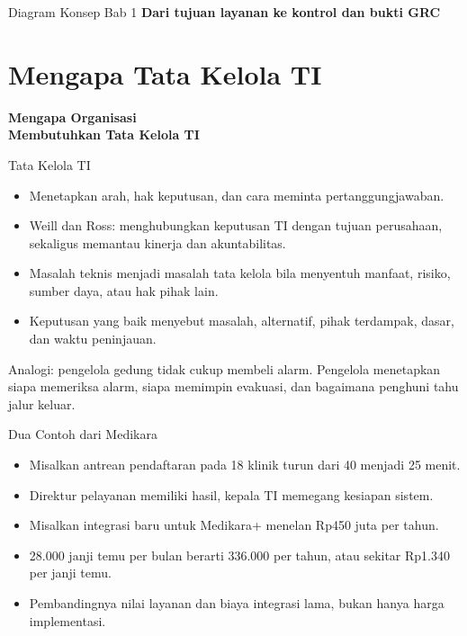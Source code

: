 \documentclass[aspectratio=169, table, 12pt]{beamer}
\begin{document}
\begin{frame}{{\Large Diagram Konsep Bab 1}}
  \centering
  {\small\bfseries Dari tujuan layanan ke kontrol dan bukti GRC}\par\medskip
  \label{fig:session01-ilustrasi-bab}
\end{frame}

\section{Mengapa Tata Kelola TI}

\begin{frame}{\hfill}
  \centering
  \Huge{\textbf{Mengapa Organisasi\\Membutuhkan Tata Kelola TI}}
\end{frame}

\begin{frame}{{\Large Tata Kelola TI}}
  \vspace{4pt}
  \small
  \begin{itemize}
    \item Menetapkan arah, hak keputusan, dan cara meminta pertanggungjawaban.
    \item Weill dan Ross: menghubungkan keputusan TI dengan tujuan perusahaan, sekaligus
          memantau kinerja dan akuntabilitas.
    \item Masalah teknis menjadi masalah tata kelola bila menyentuh manfaat, risiko, sumber
          daya, atau hak pihak lain.
    \item Keputusan yang baik menyebut masalah, alternatif, pihak terdampak, dasar, dan waktu
          peninjauan.
  \end{itemize}
  \vspace{4pt}
  {\footnotesize Analogi: pengelola gedung tidak cukup membeli alarm. Pengelola menetapkan siapa
  memeriksa alarm, siapa memimpin evakuasi, dan bagaimana penghuni tahu jalur keluar.}
\end{frame}

\begin{frame}{{\Large Dua Contoh dari Medikara}}
  \vspace{6pt}
  \small
  \begin{itemize}
    \item Misalkan antrean pendaftaran pada 18 klinik turun dari 40 menjadi 25 menit.
    \item Direktur pelayanan memiliki hasil, kepala TI memegang kesiapan sistem.
    \item Misalkan integrasi baru untuk Medikara+ menelan Rp450 juta per tahun.
    \item 28.000 janji temu per bulan berarti 336.000 per tahun, atau sekitar Rp1.340 per janji temu.
    \item Pembandingnya nilai layanan dan biaya integrasi lama, bukan hanya harga implementasi.
  \end{itemize}
\end{frame}
\end{document}

